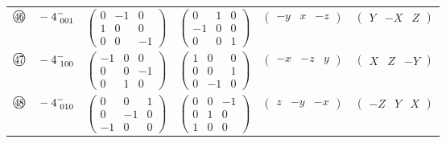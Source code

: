 \documentclass[fleqn,10pt,landscape]{jsarticle}
\begin{document}
\begin{center}
\begin{longtable}{lcccc}
$ {\ooalign{\hfil\resizebox{.8\width}{\height}{46}\hfil\crcr\raise.1ex\hbox{\large$\bigcirc$}}}\quad -4^{-}_{\,\,001} $ & $ \begin{pmatrix} 0 & -1 & 0 \\ 1 & 0 & 0 \\ 0 & 0 & -1 \end{pmatrix} $ & $ \begin{pmatrix} 0 & 1 & 0 \\ -1 & 0 & 0 \\ 0 & 0 & 1 \end{pmatrix} $ & $ \begin{pmatrix} - y & x & - z \end{pmatrix} $ & $ \begin{pmatrix} Y & - X & Z \end{pmatrix} $ \\
$ {\ooalign{\hfil\resizebox{.8\width}{\height}{47}\hfil\crcr\raise.1ex\hbox{\large$\bigcirc$}}}\quad -4^{-}_{\,\,100} $ & $ \begin{pmatrix} -1 & 0 & 0 \\ 0 & 0 & -1 \\ 0 & 1 & 0 \end{pmatrix} $ & $ \begin{pmatrix} 1 & 0 & 0 \\ 0 & 0 & 1 \\ 0 & -1 & 0 \end{pmatrix} $ & $ \begin{pmatrix} - x & - z & y \end{pmatrix} $ & $ \begin{pmatrix} X & Z & - Y \end{pmatrix} $ \\
$ {\ooalign{\hfil\resizebox{.8\width}{\height}{48}\hfil\crcr\raise.1ex\hbox{\large$\bigcirc$}}}\quad -4^{-}_{\,\,010} $ & $ \begin{pmatrix} 0 & 0 & 1 \\ 0 & -1 & 0 \\ -1 & 0 & 0 \end{pmatrix} $ & $ \begin{pmatrix} 0 & 0 & -1 \\ 0 & 1 & 0 \\ 1 & 0 & 0 \end{pmatrix} $ & $ \begin{pmatrix} z & - y & - x \end{pmatrix} $ & $ \begin{pmatrix} - Z & Y & X \end{pmatrix} $ \\
\end{longtable}
\end{center}
\newpage
\end{document}
